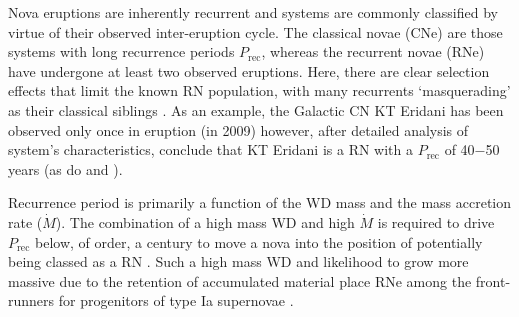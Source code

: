 \documentclass[fleqn,usenatbib]{mnras}
\begin{document}
Nova eruptions are inherently recurrent and systems are commonly classified by virtue of their observed inter-eruption cycle. The classical novae (CNe) are those systems with long recurrence periods $P_\mathrm{rec}$, whereas the recurrent novae (RNe) have undergone at least two observed eruptions. Here, there are clear selection effects that limit the known RN population, with many recurrents `masquerading' as their classical siblings \citep{2014ApJ...788..164P}. As an example, the Galactic CN KT Eridani has been observed only once in eruption (in 2009) however, after detailed analysis of system's characteristics, \citet{2022MNRAS.517.3864S} conclude that KT Eridani is a RN with a $P_\mathrm{rec}$ of 40$-$50 years (as do \citealt{2023arXiv231017055S} and \citealt{2023arXiv231017258H}).

Recurrence period is primarily a function of the WD mass and the mass accretion rate ($\dot{M}$). The combination of a high mass WD and high $\dot{M}$ is required to drive $P_\mathrm{rec}$ below, of order, a century \citep[see, for e.g.,][]{2005ApJ...623..398Y} to move a nova into the position of potentially being classed as a RN \citep[see discussion within][]{2021gacv.workE..44D}. Such a high mass WD and likelihood to grow more massive due to the retention of accumulated material \citep[see, for example,][]{2005ApJ...623..398Y,2015ApJ...808...52K,2015MNRAS.446.1924H,2016ApJ...819..168H} place RNe among the front-runners for progenitors of type Ia supernovae \citep[SNe Ia;][]{1973ApJ...186.1007W,1999ApJ...519..314H,1999ApJ...522..487H,2000ARA&A..38..191H}. 
\end{document}
